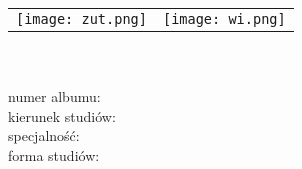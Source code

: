 %

\begingroup
\sffamily  %
\centering %
\thispagestyle{empty} %

  \begin{tabular}{p{7cm}p{7cm}}
      \texttt{[image: zut.png]}&  \texttt{[image: wi.png]}\\
    \end{tabular}\\[1cm]

 {\color{blueZUT} {\large\textbf\authornames}} \\[.5cm]
  
       \normalsize{numer albumu: }{\albumno}\\[.25cm]
        \normalsize{kierunek studiów: }{\field}\\[.25cm]
        \normalsize{specjalność: }{\speciality}\\[.25cm]
        \normalsize{forma studiów: }{\studyform}\\[1cm]
        \vfill


  {\color{blueZUT} {\large\bfseries  \MakeUppercase \ttitle }}\\[.5cm]%
  {\large\bfseries\MakeUppercase \ttitleEng }\\[1cm]%
  \vfill


